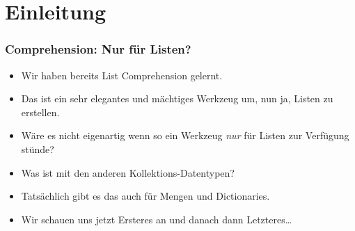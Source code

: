 \documentclass[aspectratio=169,mathserif,notheorems]{beamer}%
\subtitle{37.~Set und Dictionary Comprehension}%
\begin{document}
%
%
\startPresentation%
%
\section{Einleitung}%
\begin{frame}%
\frametitle{Comprehension: Nur für Listen?}%
\begin{itemize}%
\item Wir haben bereits List Comprehension gelernt.%
%
\item<2-> Das ist ein sehr elegantes und mächtiges Werkzeug um, nun ja, Listen zu erstellen.%
%
\item<3-> Wäre es nicht eigenartig wenn so ein Werkzeug \emph{nur} für Listen zur Verfügung stünde?%
%
\item<4-> Was ist mit den anderen Kollektions-Datentypen?%
%
\item<5-> Tatsächlich gibt es das auch für Mengen und Dictionaries.%
%
\item<6-> Wir schauen uns jetzt Ersteres an und danach dann Letzteres\dots%
\end{itemize}%
\end{frame}%
%
\end{document}
